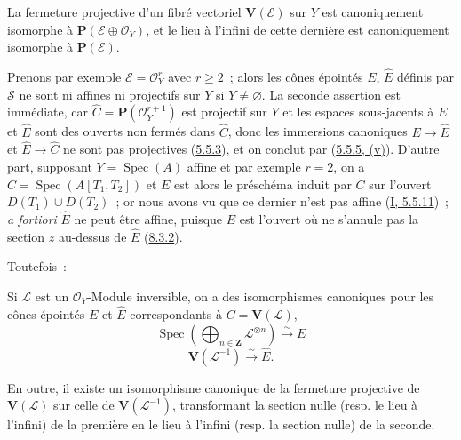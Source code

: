 \begin{proposition}[8.4.2]
\label{II.8.4.2-fr}
La fermeture projective d'un fibré vectoriel $\mathbf{V}(\mathcal{E})$ sur
$Y$ est canoniquement isomorphe à
$\mathbf{P}(\mathcal{E}\oplus\mathcal{O}_Y)$, et le lieu à l'infini de cette
dernière est canoniquement isomorphe à $\mathbf{P}(\mathcal{E})$.
\end{proposition}

\begin{remark}[8.4.3]
\label{II.8.4.3-fr}
Prenons par exemple $\mathcal{E}=\mathcal{O}_Y^r$ avec $r\geq2$~; alors les
cônes épointés $E$, $\widehat{E}$ définis par $\mathcal{S}$ ne sont ni affines
ni projectifs sur $Y$ si $Y\neq\varnothing$. La seconde assertion est
immédiate, car $\widehat{C}=\mathbf{P}(\mathcal{O}_Y^{r+1})$ est projectif sur
$Y$ et les espaces sous-jacents à $E$ et $\widehat{E}$ sont des ouverts non
fermés dans $\widehat{C}$, donc les immersions canoniques
$E\to\widehat{E}$ et $\widehat{E}\to\widehat{C}$ ne sont pas projectives
(\hyperref[II.5.5.3-fr]{5.5.3}), et on conclut par
(\hyperref[II.5.5.5-fr]{5.5.5, (v)}). D'autre part, supposant
$Y=\operatorname{Spec}(A)$ affine et par exemple $r=2$, on a
$C=\operatorname{Spec}(A[T_1,T_2])$ et $E$ est alors le préschéma induit par
$C$ sur l'ouvert $D(T_1)\cup D(T_2)$~; or nous avons vu que ce dernier n'est
pas affine (\hyperref[I.5.5.11-fr]{I, 5.5.11})~; 
\emph{a fortiori} $\widehat{E}$ ne peut être affine, puisque $E$ est l'ouvert
où ne s'annule pas la section $z$ au-dessus de $\widehat{E}$
(\hyperref[II.8.3.2-fr]{8.3.2}).

Toutefois~:
\end{remark}

\begin{proposition}[8.4.4]
\label{II.8.4.4-fr}
Si $\mathcal{L}$ est un $\mathcal{O}_Y$-Module inversible, on a des
isomorphismes canoniques pour les cônes épointés $E$ et $\widehat{E}$
correspondants à $C=\mathbf{V}(\mathcal{L})$,
\begin{equation}
\label{II.8.4.4.1-fr}
  \operatorname{Spec}\left(
    \bigoplus_{n\in\mathbf{Z}}\mathcal{L}^{\otimes n}
  \right)\xrightarrow{\sim}E
\tag{8.4.4.1}
\end{equation}
\begin{equation}
\label{II.8.4.4.2-fr}
  \mathbf{V}(\mathcal{L}^{-1})\xrightarrow{\sim}\widehat{E}.
\tag{8.4.4.2}
\end{equation}

En outre, il existe un isomorphisme canonique de la fermeture projective de
$\mathbf{V}(\mathcal{L})$ sur celle de $\mathbf{V}(\mathcal{L}^{-1})$,
transformant la section nulle (resp. le lieu à l'infini) de la première en le
lieu à l'infini (resp. la section nulle) de la seconde.
\end{proposition}

